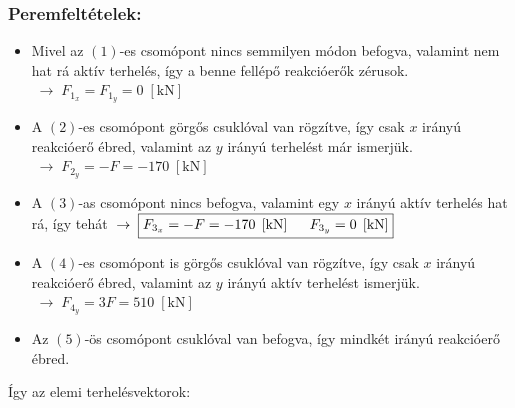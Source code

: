 \documentclass[12pt,a4paper]{article}
\def\kN{\; \left[\mathrm{kN}\right]}
\begin{document}
\subsubsection*{Peremfeltételek:}
\begin{itemize}
    \item Mivel az $\left(1\right)$-es csomópont nincs semmilyen módon
          befogva, valamint nem hat rá aktív terhelés, így a benne fellépő
          reakcióerők zérusok. $\; \rightarrow \; \boxed{F_{1_x}=F_{1_y}= 0 \kN}$
    \item A  $\left(2\right)$-es csomópont görgős csuklóval van rögzítve, így
          csak $x$ irányú reakcióerő ébred, valamint az $y$ irányú terhelést már ismerjük.
          $\; \rightarrow \; \boxed{F_{2_y}=-F=-170 \kN}$
    \item A  $\left(3\right)$-as csomópont nincs befogva, valamint egy $x$
          irányú aktív terhelés hat rá, így tehát $\; \rightarrow \; \boxed{F_{3_x}=-F=-170 \kN \hspace{5mm}
                  F_{3_y}=0 \kN}$
    \item A $\left(4\right)$-es csomópont is görgős csuklóval van rögzítve,
          így csak $x$ irányú reakcióerő ébred, valamint az $y$ irányú aktív
          terhelést ismerjük. $\; \rightarrow \; \boxed{F_{4_y}=3 F=510 \kN}$
    \item Az $\left(5\right)$-ös csomópont csuklóval van befogva, így mindkét irányú
          reakcióerő ébred.
\end{itemize}
Így az elemi terhelésvektorok:
\end{document}

